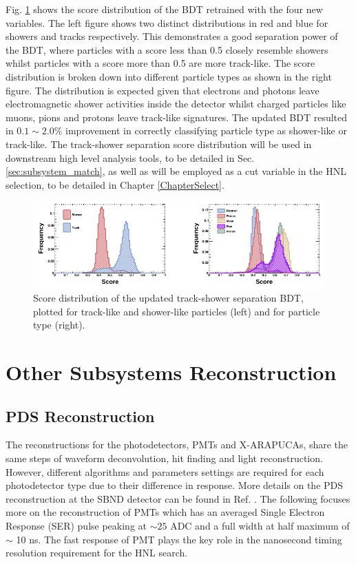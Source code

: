 Fig. \ref{fig:bdt_score} shows the score distribution of the BDT retrained with the four new variables.
The left figure shows two distinct distributions in red and blue for showers and tracks respectively.
This demonstrates a good separation power of the BDT, where particles with a score less than 0.5 closely resemble showers whilst particles with a score more than 0.5 are more track-like.
The score distribution is broken down into different particle types as shown in the right figure.
The distribution is expected given that electrons and photons leave electromagnetic shower activities inside the detector whilst charged particles like muons, pions and protons leave track-like signatures. 
The updated BDT resulted in $0.1\sim2.0\%$ improvement in correctly classifying particle type as shower-like or track-like.
The track-shower separation score distribution will be used in downstream high level analysis tools, to be detailed in Sec. \ref{sec:subsystem_match}, as well as will be employed as a cut variable in the HNL selection, to be detailed in Chapter \ref{ChapterSelect}.

\begin{figure}[htbp!]
        \centering
        \includegraphics[width=\textwidth]{bdt_score}
        \caption[bdt_score]{
	Score distribution of the updated track-shower separation BDT, plotted for track-like and shower-like particles (left) and for particle type (right).
	}
        \label{fig:bdt_score}
\end{figure}

\section{Other Subsystems Reconstruction}
\label{sec:reco_others}

\subsection{PDS Reconstruction}

The reconstructions for the photodetectors, PMTs and X-ARAPUCAs, share the same steps of waveform deconvolution, hit finding and light reconstruction.
However, different algorithms and parameters settings are required for each photodetector type due to their difference in response.
More details on the PDS reconstruction at the SBND detector can be found in Ref. \cite{}.
The following focuses more on the reconstruction of PMTs which has an averaged Single Electron Response (SER) pulse peaking at $\sim 25$ ADC and a full width at half maximum of $\sim$ 10 ns.
The fast response of PMT plays the key role in the nanosecond timing resolution requirement for the HNL search.

